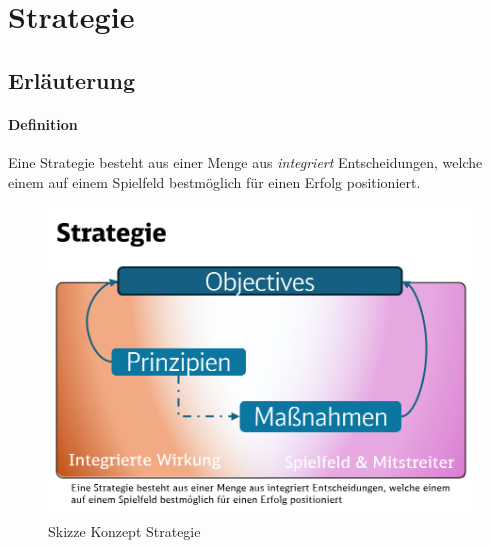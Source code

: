 \section{Strategie} \label{Appendix_Erlaeuterung_Strategie}
\subsection{Erläuterung}
\paragraph{Definition}
Eine Strategie besteht aus einer Menge aus \textit{integriert} Entscheidungen, welche einem auf einem Spielfeld bestmöglich für einen Erfolg positioniert.\\




\begin{figure}[H]
	\centering
	\includegraphics[scale = 0.3]{attachment/chapter_OWN/Scc006.png}
	\caption{Skizze Konzept Strategie}
\end{figure} 

